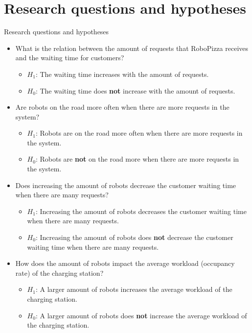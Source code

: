 \section{Research questions and hypotheses}

\begin{frame}[allowframebreaks]{Research questions and hypotheses}
    \begin{itemize}
        \item What is the relation between the amount of requests that RoboPizza receives and the waiting time for customers?
        \begin{itemize}
                \item $H_1$: The waiting time increases with the amount of requests.
                \item $H_0$: The waiting time does \textbf{not} increase with the amount of requests.
        \end{itemize}

        \item Are robots on the road more often when there are more requests in the system?
        \begin{itemize}
                \item $H_1$: Robots are on the road more often when there are more requests in the system.
                \item $H_0$: Robots are \textbf{not} on the road more when there are more requests in the system.
        \end{itemize}

        \item Does increasing the amount of robots decrease the customer waiting time when there are many requests?
        \begin{itemize}
                \item $H_1$: Increasing the amount of robots decreases the customer waiting time when there are many requests.
                \item $H_0$: Increasing the amount of robots does \textbf{not} decrease the customer waiting time when there are many requests.
        \end{itemize}

        \item How does the amount of robots impact the average workload (occupancy rate) of the charging station?
        \begin{itemize}
                \item $H_1$: A larger amount of robots increases the average workload of the charging station.
                \item $H_0$: A larger amount of robots does \textbf{not} increase the average workload of the charging station.
        \end{itemize}


\end{itemize}
\end{frame}

